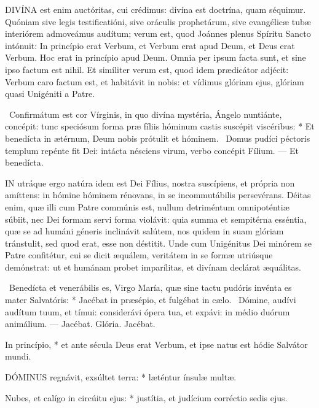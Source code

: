 
\lettrine[lines=2]{D}{IVÍNA} est enim auctóritas, cui crédimus: divína est doctrína, quam séquimur. Quóniam sive legis testificatióni, sive oráculis prophetárum, sive evangélicæ tubæ interiórem admoveámus audítum; verum est, quod Joánnes plenus Spíritu Sancto intónuit: In princípio erat Verbum, et Verbum erat apud Deum, et Deus erat Verbum. Hoc erat in princípio apud Deum. Omnia per ipsum facta sunt, et sine ipso factum est nihil. Et simíliter verum est, quod idem prædicátor adjécit: Verbum caro factum est, et habitávit in nobis: et vídimus glóriam ejus, glóriam quasi Unigéniti a Patre.

\R\ Confirmátum est cor Vírginis, in quo divína mystéria, Ángelo nuntiánte, concépit: tunc speciósum forma præ fíliis hóminum castis suscépit viscéribus: * Et benedícta in ætérnum, Deum nobis prótulit et hóminem. \V\ Domus pudíci péctoris templum repénte fit Dei: intácta nésciens virum, verbo concépit Fílium. --- Et benedícta.


\lettrine[lines=2]{I}{N} utráque ergo natúra idem est Dei Fílius, nostra suscípiens, et própria non amíttens: in hómine hóminem rénovans, in se incommutábilis persevérans. Déitas enim, quæ illi cum Patre commúnis est, nullum detriméntum omnipoténtiæ súbiit, nec Dei formam servi forma violávit: quia summa et sempitérna esséntia, quæ se ad humáni géneris inclinávit salútem, nos quidem in suam glóriam tránstulit, sed quod erat, esse non déstitit. Unde cum Unigénitus Dei minórem se Patre confitétur, cui se dicit æquálem, veritátem in se formæ utriúsque demónstrat: ut et humánam probet imparílitas, et divínam declárat æquálitas.

\R\ Benedícta et venerábilis es, Virgo María, quæ sine tactu pudóris invénta es mater Salvatóris: * Jacébat in præsépio, et fulgébat in cælo. \V\ Dómine, audívi audítum tuum, et tímui: considerávi ópera tua, et expávi: in médio duórum animálium. --- Jacébat. Glória. Jacébat.


 In princípio, * et ante sécula Deus erat Verbum, et ipse natus est hódie Salvátor mundi.


\lettrine[lines=2]{D}{ÓMINUS} regnávit, exsúltet terra: * læténtur ínsulæ multæ.

Nubes, et calígo in circúitu ejus: * justítia, et judícium corréctio sedis ejus.


